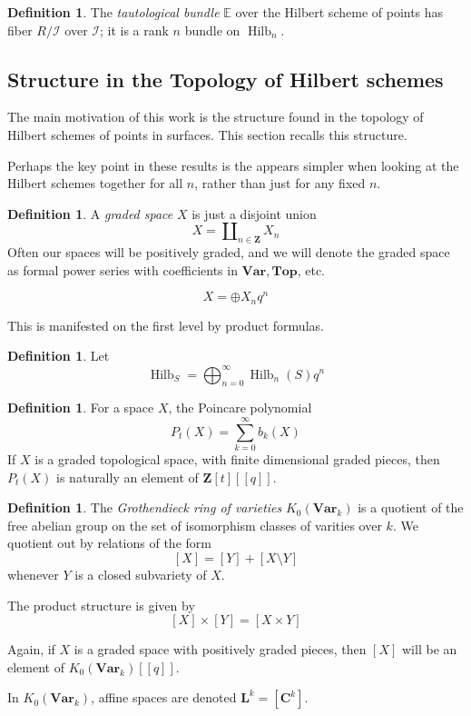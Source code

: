 \documentclass{amsart}[12pt]
\theoremstyle{definition}
\newtheorem{definition}[dummy]{Definition}
\newcommand{\Z}{\mathbf{Z}}
\newcommand{\C}{\mathbf{C}}
\newcommand{\LL}{\mathbf{L}}
\newcommand{\Var}{\mathbf{Var}}
\newcommand{\Top}{\mathbf{Top}}
\DeclareMathOperator{\Hilb}{Hilb}
\newcommand{\HG}{\Hilb}
\begin{document}
\begin{definition}
The \emph{tautological bundle} $\mathbb{E}$ over the Hilbert scheme of points has fiber $R/\mathcal{I}$ over $\mathcal{I}$; it is a rank $n$ bundle on $\Hilb_n$.
\end{definition}


\subsection{Structure in the Topology of Hilbert schemes}


The main motivation of this work is the structure found in the topology of Hilbert schemes of points in surfaces.  This section recalls this structure.

Perhaps the key point in these results is the appears simpler when looking at the Hilbert schemes together for all $n$, rather than just for any fixed $n$.  

\begin{definition}
A \emph{graded space} $X$ is just a disjoint union $$X=\amalg_{n\in\Z} X_n$$
Often our spaces will be positively graded, and we will denote the graded space as formal power series with coefficients in $\Var, \Top$, etc.

$$X=\oplus X_nq^n$$
\end{definition}


This is manifested on the first level by product formulas.  
\begin{definition}
Let 
$$\HG_S=\bigoplus_{n=0}^\infty \Hilb_n(S)q^n$$
\end{definition}

\begin{definition}
For a space $X$, the Poincare polynomial 
$$P_t(X)=\sum_{k=0}^\infty b_k(X)$$
If $X$ is a graded topological space, with finite dimensional graded pieces, then $P_t(X)$ is naturally an element of $\Z[t][[q]]$.
\end{definition}


\begin{definition}
The \emph{Grothendieck ring of varieties} $K_0(\Var_k)$ is a quotient of the free abelian group on the set of isomorphism classes of varities over $k$.  We quotient out by relations of the form
$$[X]=[Y]+[X\setminus Y]$$
whenever $Y$ is a closed subvariety of $X$.   

The product structure is given by
$$[X]\times [Y]=[X\times Y]$$

Again, if $X$ is a graded space with positively graded pieces, then $[X]$ will be an element of $K_0(\Var_k)[[q]]$.

In $K_0(\Var_k)$, affine spaces are denoted $\LL^k=[\C^k]$.

\end{definition}
\end{document}
